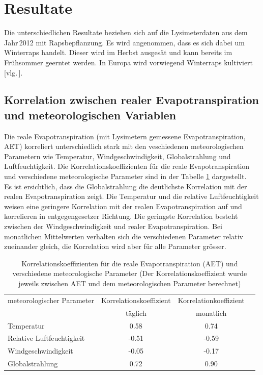 \section{Resultate}
Die unterschiedlichen Resultate beziehen sich auf die Lysimeterdaten aus dem Jahr\,2012 mit Rapsbepflanzung. Es wird angenommen, dass es sich dabei um Winterraps handelt. Dieser wird im Herbst ausgesät und kann bereits im Frühsommer geerntet werden. In Europa wird vorwiegend Winterraps kultiviert [vlg.\,\cite{raps}].

\subsection{Korrelation zwischen realer Evapotranspiration und meteorologischen Variablen}
Die reale Evapotranspiration (mit Lysimetern gemessene Evapotranspiration, AET) korreliert unterschiedlich stark mit den veschiedenen meteorologischen Parametern wie Temperatur, Windgeschwindigkeit, Globalstrahlung und Luftfeuchtigkeit. Die Korrelationskoeffizienten für die reale Evapotranspiration und verschiedene meteorologische Parameter sind in der Tabelle \ref{tab:korrelationskoeffizienten} dargestellt.\\
Es ist ersichtlich, dass die Globalstrahlung die deutlichste Korrelation mit der realen Evapotranspiration zeigt. Die Temperatur und die relative Luftfeuchtigkeit weisen eine geringere Korrelation mit der realen Evapotranspiration auf und korrelieren in entgegengesetzer Richtung. Die geringste Korrelation besteht zwischen der Windgeschwindigkeit und realer Evapotranspiration. Bei monatlichen Mittelwerten verhalten sich die verschiedenen Parameter relativ zueinander gleich, die Korrelation wird aber für alle Parameter grösser.

\begin{table}[H]
\centering
\caption{Korrelationskoeffizienten für die reale Evapotranspiration (AET) und verschiedene meteorologische Parameter (Der Korrelationskoeffizient wurde jeweils zwischen AET und dem meteorologischen Parameter berechnet)}
\begin{tabular}{lccc}
\toprule
meteorologischer Parameter			& Korrelationskoeffizient			& Korrelationkoeffizient\\
								& täglich						& monatlich\\
\midrule
Temperatur						& 0.58						& 0.74\\
Relative Luftfeuchtigkeit				& -0.51						& -0.59\\
Windgeschwindigkeit					& -0.05						& -0.17\\	
Globalstrahlung						& 0.72						& 0.90\\
\bottomrule
\end{tabular}
\label{tab:korrelationskoeffizienten}
\end{table}


